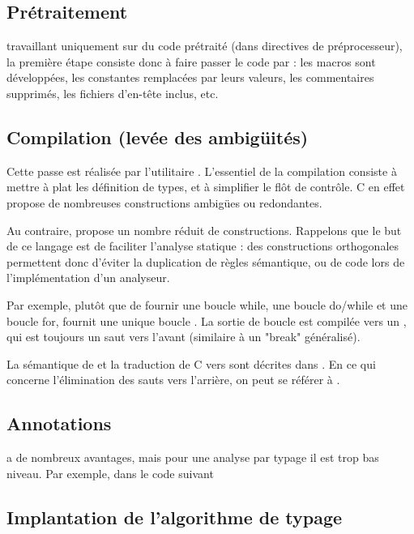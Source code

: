\subsection{Prétraitement}

\ctonewspeak{} travaillant uniquement sur du code prétraité (dans directives de
préprocesseur), la première étape consiste donc à faire passer le code par \cpp:
les macros sont développées, les constantes remplacées par leurs valeurs, les
commentaires supprimés, les fichiers d'en-tête inclus, etc.

\subsection{Compilation (levée des ambigüités)}

Cette passe est réalisée par l'utilitaire \ctonewspeak{}. L'essentiel de la
compilation consiste à mettre à plat les définition de types, et à simplifier le
flôt de contrôle. C en effet propose de nombreuses constructions ambigües ou
redondantes.

Au contraire, \newspeak{} propose un nombre réduit de constructions. Rappelons
que le but de ce langage est de faciliter l'analyse statique : des constructions
orthogonales permettent donc d'éviter la duplication de règles sémantique, ou de
code lors de l'implémentation d'un analyseur.

Par exemple, plutôt que de fournir une boucle while, une boucle do/while et une
boucle for, \newspeak{} fournit une unique boucle \npkWhile{}. La sortie de
boucle est compilée vers un \npkGoto{}, qui est toujours un saut vers l'avant
(similaire à un "break" généralisé).

La sémantique de \newspeak{} et la traduction de C vers \newspeak{} sont
décrites dans \cite{newspeak}. En ce qui concerne l'élimination des sauts vers
l'arrière, on peut se référer à \cite{goto}.

\subsection{Annotations}

\newspeak{} a de nombreux avantages, mais pour une analyse par typage il est
trop bas niveau. Par exemple, dans le code suivant



\wip{}

\subsection{Implantation de l'algorithme de typage}

